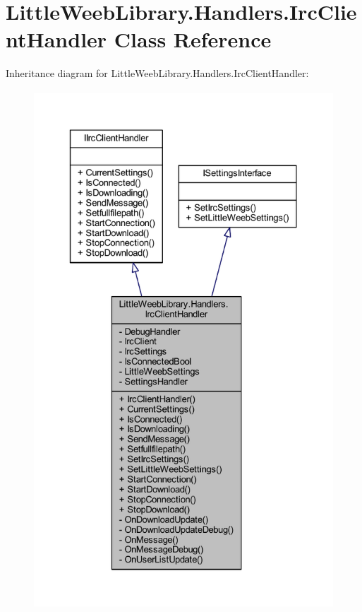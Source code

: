 \hypertarget{class_little_weeb_library_1_1_handlers_1_1_irc_client_handler}{}\section{Little\+Weeb\+Library.\+Handlers.\+Irc\+Client\+Handler Class Reference}
\label{class_little_weeb_library_1_1_handlers_1_1_irc_client_handler}


Inheritance diagram for Little\+Weeb\+Library.\+Handlers.\+Irc\+Client\+Handler\+:\nopagebreak
\begin{figure}[H]
\begin{center}
\leavevmode
\includegraphics[height=550pt]{class_little_weeb_library_1_1_handlers_1_1_irc_client_handler__inherit__graph}
\end{center}
\end{figure}


